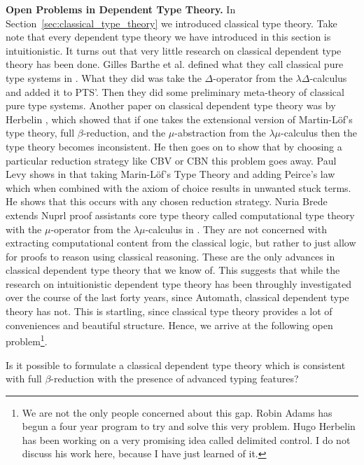 \textbf{Open Problems in Dependent Type Theory.}  In
Section~\ref{sec:classical_type_theory} we introduced classical type
theory.  Take note that every dependent type theory we have introduced
in this section is intuitionistic. It turns out that very little
research on classical dependent type theory has been done.  Gilles
Barthe et al.  defined what they call classical pure type systems in
\cite{Barthe:1997}.  What they did was take the $\Delta$-operator from
the $\lambda\Delta$-calculus and added it to PTS'.  Then they did some
preliminary meta-theory of classical pure type systems.  Another paper
on classical dependent type theory was by Herbelin
\cite{Herbelin:2005}, which showed that if one takes the extensional
version of Martin-L\"of's type theory, full $\beta$-reduction, and the
$\mu$-abstraction from the $\lambda\mu$-calculus then the type theory
becomes inconsistent.  He then goes on to show that by choosing a
particular reduction strategy like CBV or CBN this problem goes away.
Paul Levy shows in \cite{Levy:2001} that taking Marin-L\"of's Type
Theory and adding Peirce's law which when combined with the axiom of
choice results in unwanted stuck terms.  He shows that this occurs
with any chosen reduction strategy.  Nuria Brede extends Nuprl proof
assistants core type theory called computational type theory with the
$\mu$-operator from the $\lambda\mu$-calculus in \cite{Brede:2009}.
They are not concerned with extracting computational content from the
classical logic, but rather to just allow for proofs to reason using
classical reasoning.  These are the only advances in classical
dependent type theory that we know of.  This suggests that while the
research on intuitionistic dependent type theory has been throughly
investigated over the course of the last forty years, since Automath,
classical dependent type theory has not.  This is startling, since
classical type theory provides a lot of conveniences and beautiful
structure.  Hence, we arrive at the following open problem\footnote{We
  are not the only people concerned about this gap.  Robin Adams has
  begun a four year program to try and solve this very problem.  Hugo
  Herbelin has been working on a very promising idea called delimited
  control.  I do not discuss his work here, because I have just
  learned of it.}.
\begin{openproblem}
  Is it possible to formulate a classical dependent type theory which
  is consistent with full $\beta$-reduction with the presence of
  advanced typing features?
\end{openproblem}
